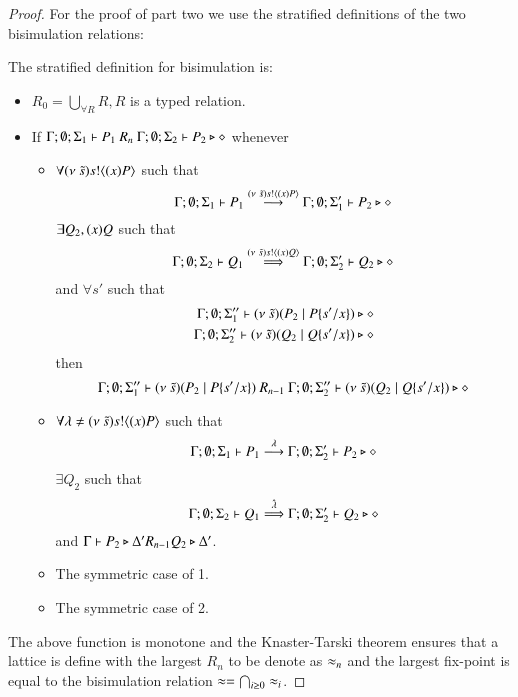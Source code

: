 \begin{proof}

	For the proof of part two we use the stratified definitions of the two bisimulation relations:

	The stratified definition for bisimulation is:

	\begin{itemize}
		\item	$R_0 = \bigcup_{\forall R} R, R$ is a typed relation.
		\item	If $\Gamma; \emptyset; \Sigma_1 \vdash P_1\ R_n\ \Gamma; \emptyset; \Sigma_2 \vdash P_2 \triangleright \diamond$
			whenever
			\begin{itemize}
				\item	$\forall (\nu\ \tilde{s}) s ! \langle (x)P \rangle$ such that
					\[
						\Gamma; \emptyset; \Sigma_1 \vdash P_1 \stackrel{(\nu\ \tilde{s}) s ! \langle (x)P \rangle}{\longrightarrow} \Gamma; \emptyset; \Sigma_1' \vdash P_2 \triangleright \diamond
					\]
					$\exists Q_2, (x)Q$ such that
					\[
						\Gamma; \emptyset; \Sigma_2 \vdash Q_1 \stackrel{(\nu\ \tilde{s}) s ! \langle (x)Q \rangle}{\Longrightarrow} \Gamma; \emptyset; \Sigma_2' \vdash Q_2 \triangleright \diamond
					\]
					and $\forall s'$
					such that
					\begin{eqnarray*}
						\Gamma; \emptyset; \Sigma_1'' \vdash (\nu\ \tilde{s})(P_2 \;|\; P \{s'/x \}) \triangleright \diamond \\
						\Gamma; \emptyset; \Sigma_2'' \vdash (\nu\ \tilde{s})(Q_2 \;|\; Q \{s'/x \}) \triangleright \diamond
					\end{eqnarray*}
					then
					\[
						\Gamma; \emptyset; \Sigma_1'' \proves \newsp{\tilde{s}}{P_2 \Par P \subst{s'}{x}}\ R_{n-1}\ 
						\Gamma; \emptyset; \Sigma_2'' \proves \newsp{\tilde{s}}{Q_2 \Par Q \subst{s'}{x}} \hastype \Proc
					\]

				\item	$\forall \lambda \not= (\nu\ \tilde{s}) s ! \langle (x)P \rangle$ such that
					\[
						\Gamma; \emptyset; \Sigma_1 \vdash P_1 \stackrel{\lambda}{\longrightarrow} \Gamma; \emptyset; \Sigma_2' \vdash P_2 \triangleright \diamond
					\]
					$\exists Q_2$ such that 
					\[
						\Gamma; \emptyset; \Sigma_2 \vdash Q_1 \stackrel{\hat{\lambda}}{\Longrightarrow} \Gamma; \emptyset; \Sigma_2' \vdash Q_2 \triangleright \diamond
					\]
					and
					$\Gamma \vdash P_2 \triangleright \Delta' R_{n-1} Q_2 \triangleright \Delta'$.

				\item	The symmetric case of 1.
				\item	The symmetric case of 2.
			\end{itemize}
	\end{itemize}
	\noi The above function is monotone and the Knaster-Tarski theorem ensures that a lattice is define
	with the largest $R_n$ to be denote as $\approx_n$ and the largest fix-point is equal to the bisimulation relation $\approx = \bigcap_{i \geq 0} \approx_i$.


\end{proof}
